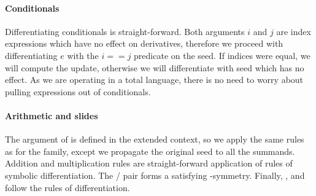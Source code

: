 \paragraph{Conditionals} Differentiating
conditionals is straight-forward.  Both arguments $i$ and $j$ are index expressions
which have no effect on derivatives, therefore we proceed with 
differentiating $e$ with the $i == j$ predicate on the seed.  If indices were equal,
we will compute the update, otherwise we will differentiate with seed  which
has no effect.  As we are operating in a total language, there is no need to worry
about pulling expressions out of conditionals.

\paragraph{Arithmetic and slides} The argument of  is defined in the
extended context, so we apply the same rules as for the  family,
except we propagate the original seed to all the summands.  Addition and
multiplication rules are straight-forward application of rules of symbolic
differentiation. The / pair forms a satisfying
-symmetry.  Finally, ,  and  follow
the rules of differentiation.

